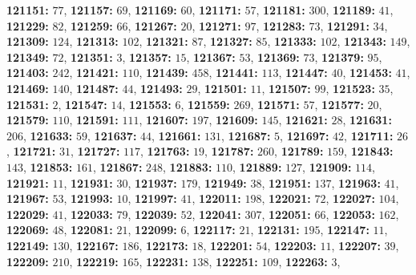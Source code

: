 \textsf{\bfseries 121151:} $77$, \textsf{\bfseries 121157:} $69$, \textsf{\bfseries 121169:} $60$, \textsf{\bfseries 121171:} $57$, \textsf{\bfseries 121181:} $300$, \textsf{\bfseries 121189:} $41$, \textsf{\bfseries 121229:} $82$, \textsf{\bfseries 121259:} $66$, \textsf{\bfseries 121267:} $20$, \textsf{\bfseries 121271:} $97$, \textsf{\bfseries 121283:} $73$, \textsf{\bfseries 121291:} $34$, \textsf{\bfseries 121309:} $124$, \textsf{\bfseries 121313:} $102$, \textsf{\bfseries 121321:} $87$, \textsf{\bfseries 121327:} $85$, \textsf{\bfseries 121333:} $102$, \textsf{\bfseries 121343:} $149$, \textsf{\bfseries 121349:} $72$, \textsf{\bfseries 121351:} $3$, \textsf{\bfseries 121357:} $15$, \textsf{\bfseries 121367:} $53$, \textsf{\bfseries 121369:} $73$, \textsf{\bfseries 121379:} $95$, \textsf{\bfseries 121403:} $242$, \textsf{\bfseries 121421:} $110$, \textsf{\bfseries 121439:} $458$, \textsf{\bfseries 121441:} $113$, \textsf{\bfseries 121447:} $40$, \textsf{\bfseries 121453:} $41$, \textsf{\bfseries 121469:} $140$, \textsf{\bfseries 121487:} $44$, \textsf{\bfseries 121493:} $29$, \textsf{\bfseries 121501:} $11$, \textsf{\bfseries 121507:} $99$, \textsf{\bfseries 121523:} $35$, \textsf{\bfseries 121531:} $2$, \textsf{\bfseries 121547:} $14$, \textsf{\bfseries 121553:} $6$, \textsf{\bfseries 121559:} $269$, \textsf{\bfseries 121571:} $57$, \textsf{\bfseries 121577:} $20$, \textsf{\bfseries 121579:} $110$, \textsf{\bfseries 121591:} $111$, \textsf{\bfseries 121607:} $197$, \textsf{\bfseries 121609:} $145$, \textsf{\bfseries 121621:} $28$, \textsf{\bfseries 121631:} $206$, \textsf{\bfseries 121633:} $59$, \textsf{\bfseries 121637:} $44$, \textsf{\bfseries 121661:} $131$, \textsf{\bfseries 121687:} $5$, \textsf{\bfseries 121697:} $42$, \textsf{\bfseries 121711:} $26$, \textsf{\bfseries 121721:} $31$, \textsf{\bfseries 121727:} $117$, \textsf{\bfseries 121763:} $19$, \textsf{\bfseries 121787:} $260$, \textsf{\bfseries 121789:} $159$, \textsf{\bfseries 121843:} $143$, \textsf{\bfseries 121853:} $161$, \textsf{\bfseries 121867:} $248$, \textsf{\bfseries 121883:} $110$, \textsf{\bfseries 121889:} $127$, \textsf{\bfseries 121909:} $114$, \textsf{\bfseries 121921:} $11$, \textsf{\bfseries 121931:} $30$, \textsf{\bfseries 121937:} $179$, \textsf{\bfseries 121949:} $38$, \textsf{\bfseries 121951:} $137$, \textsf{\bfseries 121963:} $41$, \textsf{\bfseries 121967:} $53$, \textsf{\bfseries 121993:} $10$, \textsf{\bfseries 121997:} $41$, \textsf{\bfseries 122011:} $198$, \textsf{\bfseries 122021:} $72$, \textsf{\bfseries 122027:} $104$, \textsf{\bfseries 122029:} $41$, \textsf{\bfseries 122033:} $79$, \textsf{\bfseries 122039:} $52$, \textsf{\bfseries 122041:} $307$, \textsf{\bfseries 122051:} $66$, \textsf{\bfseries 122053:} $162$, \textsf{\bfseries 122069:} $48$, \textsf{\bfseries 122081:} $21$, \textsf{\bfseries 122099:} $6$, \textsf{\bfseries 122117:} $21$, \textsf{\bfseries 122131:} $195$, \textsf{\bfseries 122147:} $11$, \textsf{\bfseries 122149:} $130$, \textsf{\bfseries 122167:} $186$, \textsf{\bfseries 122173:} $18$, \textsf{\bfseries 122201:} $54$, \textsf{\bfseries 122203:} $11$, \textsf{\bfseries 122207:} $39$, \textsf{\bfseries 122209:} $210$, \textsf{\bfseries 122219:} $165$, \textsf{\bfseries 122231:} $138$, \textsf{\bfseries 122251:} $109$, \textsf{\bfseries 122263:} $3$, 

